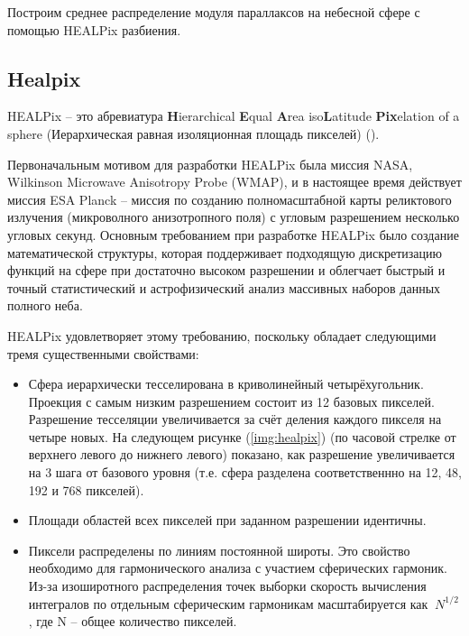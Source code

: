 \documentclass[14pt]{article} %
\begin{document}
Построим среднее распределение модуля параллаксов на небесной сфере с помощью HEALPix разбиения.

\subsection{Healpix}\label{sub:smthhealpix}
HEALPix -- это абревиатура \textbf{H}ierarchical \textbf{E}qual \textbf{A}rea iso\textbf{L}atitude \textbf{Pix}elation of a sphere (Иерархическая равная изоляционная площадь пикселей) (\cite{book:healpix}).

Первоначальным мотивом для разработки HEALPix была миссия NASA, Wilkinson Microwave Anisotropy Probe (WMAP), и в настоящее время действует миссия ESA Planck -- миссия по созданию полномасштабной карты реликтового излучения (микроволного анизотропного поля) с угловым разрешением несколько угловых секунд. Основным требованием при разработке HEALPix  было создание математической структуры, которая поддерживает подходящую дискретизацию функций на сфере при достаточно высоком разрешении и облегчает быстрый и точный статистический и астрофизический анализ массивных наборов данных полного неба.

HEALPix удовлетворяет этому требованию, поскольку обладает следующими тремя существенными свойствами:

\begin{itemize}
\item Сфера иерархически тесселирована в криволинейный четырёхугольник. Проекция с самым низким разрешением состоит из 12 базовых пикселей. Разрешение тесселяции увеличивается за счёт деления каждого пикселя на четыре новых. На следующем рисунке (\ref{img:healpix}) (по часовой стрелке от верхнего левого до нижнего левого) показано, как разрешение увеличивается на 3 шага от базового уровня (т.е. сфера разделена соответственнно на 12, 48, 192 и 768 пикселей).
\item Площади областей всех пикселей при заданном разрешении идентичны.
\item Пиксели распределены по линиям постоянной широты. Это свойство необходимо для гармонического анализа с участием сферических гармоник. Из-за изоширотного распределения точек выборки скорость вычисления интегралов по отдельным сферическим гармоникам масштабируется как $~N^{1/2}$, где N --  общее количество пикселей.
\end{itemize}
\end{document}
